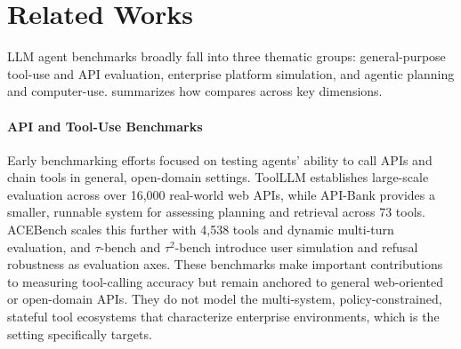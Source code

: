 \section{Related Works}



LLM agent benchmarks broadly fall into three thematic groups: general-purpose tool-use and API evaluation, enterprise platform simulation, and agentic planning and computer-use.  summarizes how \dataset{} compares across key dimensions.

\paragraph{API and Tool-Use Benchmarks}
Early benchmarking efforts focused on testing agents' ability to call APIs and chain tools in general, open-domain settings. ToolLLM \citep{qin2024toolllm} establishes large-scale evaluation across over 16,000 real-world web APIs, while API-Bank \citep{li-etal-2023-api} provides a smaller, runnable system for assessing planning and retrieval across 73 tools. ACEBench \citep{chen2025acebenchwinsmatchpoint} scales this further with 4,538 tools and dynamic multi-turn evaluation, and $\tau$-bench \citep{yao2024taubenchbenchmarktoolagentuserinteraction} and $\tau^2$-bench \citep{barres2025tau2} introduce user simulation and refusal robustness as evaluation axes. These benchmarks make important contributions to measuring tool-calling accuracy but remain anchored to general web-oriented or open-domain APIs. They do not model the multi-system, policy-constrained, stateful tool ecosystems that characterize enterprise environments, which is the setting \ours{} specifically targets.

